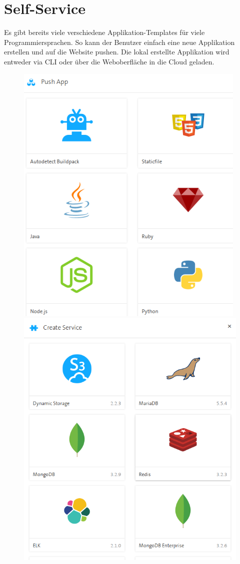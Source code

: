\section{Self-Service}
Es gibt bereits viele verschiedene Applikation-Templates für viele Programmiersprachen. So kann der Benutzer einfach eine neue Applikation erstellen und auf die Website pushen. Die lokal erstellte Applikation wird entweder via CLI oder über die Weboberfläche in die Cloud geladen.
\begin{figure}[H]
\centering
\includegraphics[scale=0.65]{images/image01.png} 
\includegraphics[scale=0.3]{images/image08.png} 
\end{figure}

